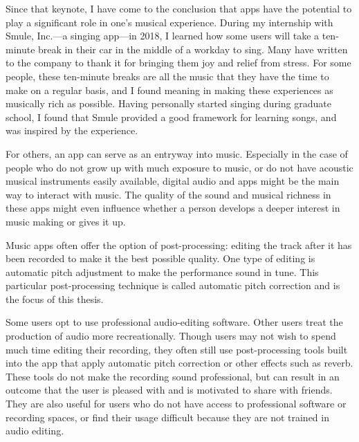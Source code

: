 Since that keynote, I have come to the conclusion that apps have the potential to play a significant role in one's musical experience. During my internship with Smule, Inc.---a singing app---in 2018, I learned how some users will take a ten-minute break in their car in the middle of a workday to sing. Many have written to the company to thank it for bringing them joy and relief from stress. For some people, these ten-minute breaks are all the music that they have the time to make on a regular basis, and I found meaning in making these experiences as musically rich as possible. Having personally started singing during graduate school, I found that Smule provided a good framework for learning songs, and was inspired by the experience.

For others, an app can serve as an entryway into music. Especially in the case of people who do not grow up with much exposure to music, or do not have acoustic musical instruments easily available, digital audio and apps might be the main way to interact with music. The quality of the sound and musical richness in these apps might even influence whether a person develops a deeper interest in music making or gives it up. 

Music apps often offer the option of post-processing: editing the track after it has been recorded to make it the best possible quality. One type of editing is automatic pitch adjustment to make the performance sound in tune. This particular post-processing technique is called automatic pitch correction and is the focus of this thesis. 

Some users opt to use professional audio-editing software. Other users treat the production of audio more recreationally. Though users may not wish to spend much time editing their recording, they often still use post-processing tools built into the app that apply automatic pitch correction or other effects such as reverb. These tools do not make the recording sound professional, but can result in an outcome that the user is pleased with and is motivated to share with friends. They are also useful for users who do not have access to professional software or recording spaces, or find their usage difficult because they are not trained in audio editing. 

